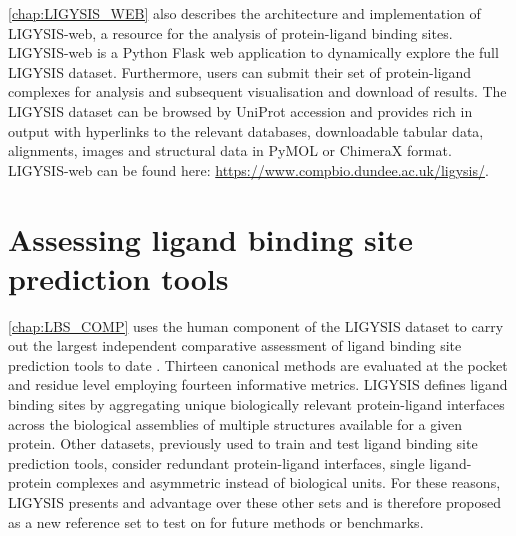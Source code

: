 
\autoref{chap:LIGYSIS_WEB} also describes the architecture and implementation of LIGYSIS-web, a resource for the analysis of protein-ligand binding sites. LIGYSIS-web is a Python Flask web application to dynamically explore the full LIGYSIS dataset. Furthermore, users can submit their set of protein-ligand complexes for analysis and subsequent visualisation and download of results. The LIGYSIS dataset can be browsed by UniProt accession and provides rich in output with hyperlinks to the relevant databases, downloadable tabular data, alignments, images and structural data in PyMOL or ChimeraX format. LIGYSIS-web can be found here: \url{https://www.compbio.dundee.ac.uk/ligysis/}.


\section{Assessing ligand binding site prediction tools}

\autoref{chap:LBS_COMP} uses the human component of the LIGYSIS dataset to carry out the largest independent comparative assessment of ligand binding site prediction tools to date \cite{UTGES_2024_LBSCOMP}. Thirteen canonical methods are evaluated at the pocket and residue level employing fourteen informative metrics. LIGYSIS defines ligand binding sites by aggregating unique biologically relevant protein-ligand interfaces across the biological assemblies of multiple structures available for a given protein. Other datasets, previously used to train and test ligand binding site prediction tools, consider redundant protein-ligand interfaces, single ligand-protein complexes and asymmetric instead of biological units. For these reasons, LIGYSIS presents and advantage over these other sets and is therefore proposed as a new reference set to test on for future methods or benchmarks.

